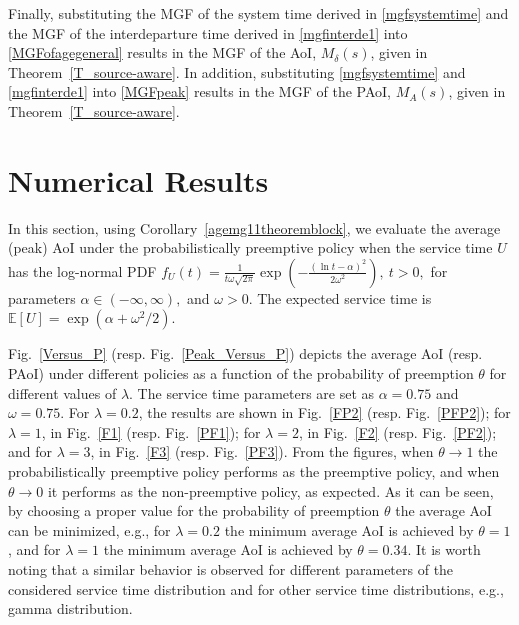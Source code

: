 \documentclass[conference]{IEEEtran}
\newcommand{\E}[1]{\mathbb{E}[#1]}
\begin{document}
Finally, substituting the MGF of the system time derived in  \eqref{mgfsystemtime} and the MGF of the interdeparture time derived in \eqref{mgfinterde1}  into \eqref{MGFofagegeneral}  results in the MGF of the AoI, ${M}_{\delta}(s)$, given in Theorem~\ref{T_source-aware}. In addition, substituting   \eqref{mgfsystemtime} and \eqref{mgfinterde1} into \eqref{MGFpeak} results in the MGF of the PAoI, ${M}_{A}(s)$, given in Theorem~\ref{T_source-aware}.

\section{Numerical Results}\label{Numerical Results}
In this section, using Corollary~\ref{agemg11theoremblock}, we evaluate the average (peak) AoI under the probabilistically preemptive policy when the service time $U$ 
has the log-normal PDF %
$f_U(t)=\frac{1}{t\omega\sqrt{2\pi}}\exp\left(-\frac{(\ln{t}-\alpha)^2}{2\omega^2}\right)\!,~t>0,$
for parameters $ \alpha\in(-\infty,\infty),$ and ${\omega>0}$. The  expected service time is  $\E{U}=\exp(\alpha+{\omega^2}/{2})$.


 Fig.~\ref{Versus_P} (resp. Fig.~\ref{Peak_Versus_P}) depicts the average AoI (resp. PAoI) under different policies as a function of the probability of preemption $\theta$ for different values of $\lambda$. The service time parameters are set as  $\alpha=0.75$ and $\omega=0.75$. For $\lambda=0.2$, the results are shown in Fig.~\ref{FP2} (resp. Fig.~\ref{PFP2}); for $\lambda=1$, in Fig.~\ref{F1} (resp. Fig.~\ref{PF1}); for $\lambda=2$, in Fig.~\ref{F2} (resp. Fig.~\ref{PF2}); and for $\lambda=3$, in Fig.~\ref{F3} (resp. Fig.~\ref{PF3}).
 From the figures, when $\theta\rightarrow 1$ the probabilistically preemptive policy performs as the preemptive policy, and when $\theta\rightarrow 0$ it performs as the non-preemptive policy, as expected. As it can be seen, by choosing a proper value for the probability of preemption $\theta$ the average AoI can be minimized, e.g., for $\lambda=0.2$ the minimum average AoI is achieved by $\theta=1$, and for $\lambda=1$ the minimum average AoI is achieved by $\theta=0.34$. It is worth noting that a similar behavior is observed for different parameters of the considered service time distribution and for other service time distributions, e.g., gamma distribution. 
\end{document}
